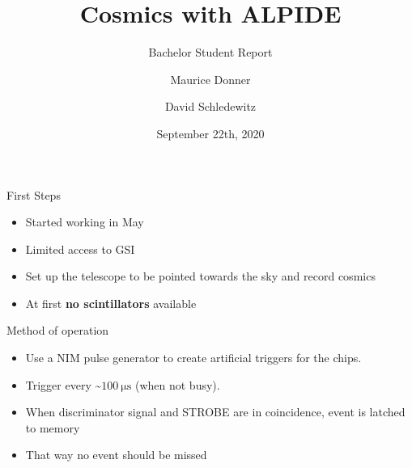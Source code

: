 \documentclass{beamer}
\title{\texorpdfstring{\color{blue!50!black}\textbf{Cosmics with ALPIDE}}{}}
\subtitle{Bachelor Student Report}
\author[Maurice \and David]{Maurice Donner \and David Schledewitz}
\date{September 22th, 2020}
\begin{document}
\maketitle
\newpage


\begin{frame}{First Steps}
    \begin{itemize}
	\item Started working in May
	\item Limited access to GSI
	\item Set up the telescope to be pointed towards the sky and record
	    cosmics
	\item At first \textbf{no scintillators} available \\[1cm]
    \end{itemize}

\LARGE Method of operation \footnotesize \\[.5cm]

\begin{minipage}[b]{.49\textwidth}
    \begin{itemize}
	\item Use a NIM pulse generator to create artificial triggers for the
	    chips.
	\item Trigger every \textasciitilde \( 100 \ \si{\micro \second} \) 
	    (when not busy).
	\item When discriminator signal and STROBE are in coincidence, event is
	    latched to memory
	\item That way no event should be missed
    \end{itemize}
\end{minipage}


\end{frame}
\end{document}
